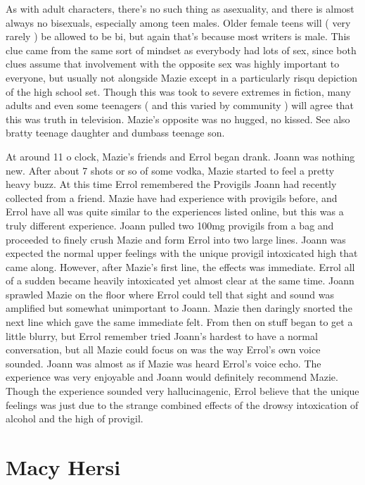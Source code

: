 \documentclass[12pt]{book}
\begin{document}
As with adult characters, there's no such thing as asexuality, and there is almost always no bisexuals, especially among teen males. Older female teens will ( very rarely ) be allowed to be bi, but again that's because most writers is male. This clue came from the same sort of mindset as everybody had lots of sex, since both clues assume that involvement with the opposite sex was highly important to everyone, but usually not alongside Mazie except in a particularly risqu depiction of the high school set. Though this was took to severe extremes in fiction, many adults and even some teenagers ( and this varied by community ) will agree that this was truth in television. Mazie's opposite was no hugged, no kissed. See also bratty teenage daughter and dumbass teenage son.



At around 11 o clock, Mazie's friends and Errol began drank. Joann was nothing new. After about 7 shots or so of some vodka, Mazie started to feel a pretty heavy buzz. At this time Errol remembered the Provigils Joann had recently collected from a friend. Mazie have had experience with provigils before, and Errol have all was quite similar to the experiences listed online, but this was a truly different experience. Joann pulled two 100mg provigils from a bag and proceeded to finely crush Mazie and form Errol into two large lines. Joann was expected the normal upper feelings with the unique provigil intoxicated high that came along. However, after Mazie's first line, the effects was immediate. Errol all of a sudden became heavily intoxicated yet almost clear at the same time. Joann sprawled Mazie on the floor where Errol could tell that sight and sound was amplified but somewhat unimportant to Joann. Mazie then daringly snorted the next line which gave the same immediate felt. From then on stuff began to get a little blurry, but Errol remember tried Joann's hardest to have a normal conversation, but all Mazie could focus on was the way Errol's own voice sounded. Joann was almost as if Mazie was heard Errol's voice echo. The experience was very enjoyable and Joann would definitely recommend Mazie. Though the experience sounded very hallucinagenic, Errol believe that the unique feelings was just due to the strange combined effects of the drowsy intoxication of alcohol and the high of provigil.



\chapter{Macy Hersi}
\end{document}
